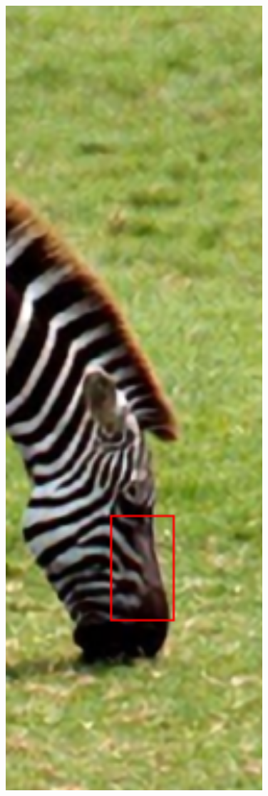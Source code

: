 \documentclass[review,numbers,sort&compress]{elsarticle}  %
\begin{document}
\begin{figure}[t]
{\begin{minipage}[b]{0.12\textwidth}
                \includegraphics[width=1\textwidth]{compareImage/zebra_crop_lapSRN.png} \\

\end{minipage}}
\end{figure}
\end{document}
